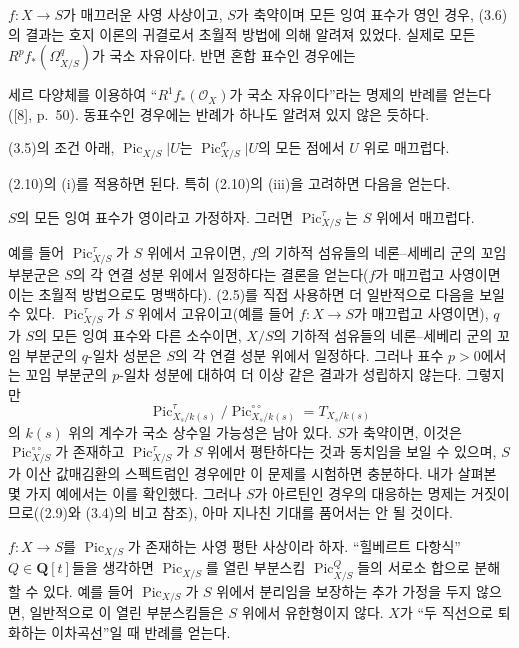  $f:X\longrightarrow S$가 매끄러운 사영 사상이고,
$S$가 축약이며 모든 잉여 표수가 영인 경우, (3.6)의 결과는 호지 이론의
귀결로서 초월적 방법에 의해 알려져 있었다. 실제로 모든
$R^pf_*(\Omega^q_{X/S})$가 국소 자유이다. 반면 혼합 표수인 경우에는

세르 다양체를 이용하여 ``$R^1f_*(\mathcal O_X)$가 국소 자유이다''라는
명제의 반례를 얻는다([8], p.~50). 동표수인 경우에는 반례가 하나도 알려져
있지 않은 듯하다.

 (3.5)의 조건 아래,
$\operatorname{Pic}_{X/S}|U$는 $\operatorname{Pic}_{X/S}^\sigma|U$의
모든 점에서 $U$ 위로 매끄럽다.

(2.10)의 (i)를 적용하면 된다. 특히 (2.10)의 (iii)을 고려하면 다음을 얻는다.

 $S$의 모든 잉여 표수가 영이라고 가정하자. 그러면
$\operatorname{Pic}_{X/S}^\tau$는 $S$ 위에서 매끄럽다.

 예를 들어 $\operatorname{Pic}_{X/S}^\tau$가 $S$
위에서 고유이면, $f$의 기하적 섬유들의 네론--세베리 군의 꼬임 부분군은
$S$의 각 연결 성분 위에서 일정하다는 결론을 얻는다($f$가 매끄럽고
사영이면 이는 초월적 방법으로도 명백하다). (2.5)를 직접 사용하면 더
일반적으로 다음을 보일 수 있다. $\operatorname{Pic}_{X/S}^\tau$가 $S$
위에서 고유이고(예를 들어 $f:X\longrightarrow S$가 매끄럽고 사영이면),
$q$가 $S$의 모든 잉여 표수와 다른 소수이면, $X/S$의 기하적 섬유들의
네론--세베리 군의 꼬임 부분군의 $q$-일차 성분은 $S$의 각 연결 성분
위에서 일정하다. 그러나 표수 $p>0$에서는 꼬임 부분군의 $p$-일차 성분에
대하여 더 이상 같은 결과가 성립하지 않는다. 그렇지만
\[
\operatorname{Pic}_{X_s/k(s)}^\tau/
\operatorname{Pic}_{X_s/k(s)}^{\circ\circ}=T_{X_s/k(s)}
\]
의 $k(s)$ 위의 계수가 국소 상수일 가능성은 남아 있다. $S$가 축약이면,
이것은 $\operatorname{Pic}_{X/S}^{\circ\circ}$가 존재하고
$\operatorname{Pic}_{X/S}^\tau$가 $S$ 위에서 평탄하다는 것과 동치임을
보일 수 있으며, $S$가 이산 값매김환의 스펙트럼인 경우에만 이 문제를
시험하면 충분하다. 내가 살펴본 몇 가지 예에서는 이를 확인했다. 그러나
$S$가 아르틴인 경우의 대응하는 명제는 거짓이므로((2.9)와 (3.4)의 비고
참조), 아마 지나친 기대를 품어서는 안 될 것이다.


$f:X\longrightarrow S$를 $\operatorname{Pic}_{X/S}$가 존재하는 사영 평탄
사상이라 하자. ``힐베르트 다항식'' $Q\in\mathbf Q[t]$들을 생각하면
$\operatorname{Pic}_{X/S}$를 열린 부분스킴
$\operatorname{Pic}_{X/S}^Q$들의 서로소 합으로 분해할 수 있다. 예를 들어
$\operatorname{Pic}_{X/S}$가 $S$ 위에서 분리임을 보장하는 추가 가정을
두지 않으면, 일반적으로 이 열린 부분스킴들은 $S$ 위에서 유한형이지 않다.
$X$가 ``두 직선으로 퇴화하는 이차곡선''일 때 반례를 얻는다.

